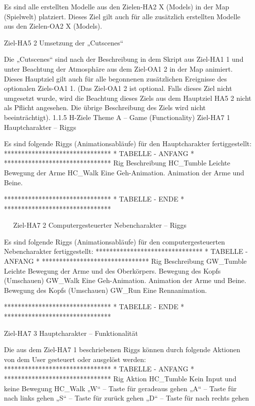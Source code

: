 Es sind alle erstellten Modelle aus den Zielen-HA2 X (Models) in der Map (Spielwelt) platziert. Dieses Ziel gilt auch für alle zusätzlich erstellten Modelle aus den Zielen-OA2 X (Models).

Ziel-HA5 2	Umsetzung der „Cutscenes“

Die „Cutscenes“ sind nach der Beschreibung in dem Skript aus Ziel-HA1 1 und unter Beachtung der Atmosphäre aus dem Ziel-OA1 2 in der Map animiert. Dieses Hauptziel gilt auch für alle begonnenen zusätzlichen Ereignisse des optionalen Ziels-OA1 1.
(Das Ziel-OA1 2 ist optional. Falls dieses Ziel nicht umgesetzt wurde, wird die Beachtung dieses Ziels aus dem Hauptziel HA5 2 nicht als Pflicht angesehen. Die übrige Beschreibung des Ziels wird nicht beeinträchtigt).
1.1.5	H-Ziele Theme A – Game (Functionality)
Ziel-HA7 1	Hauptcharakter – Riggs

Es sind folgende Riggs (Animationsabläufe) für den Hauptcharakter fertiggestellt:
		 *******************************
		 *  TABELLE - ANFANG           *
		 *******************************
Rig	Beschreibung
HC_Tumble	Leichte Bewegung der Arme
HC_Walk	Eine Geh-Animation. Animation der Arme und Beine.

		 *******************************
		 *  TABELLE - ENDE             *
		 *******************************




 
Ziel-HA7 2	Computergesteuerter Nebencharakter – Riggs

Es sind folgende Riggs (Animationsabläufe) für den computergesteuerten Nebencharakter fertiggestellt:
		 *******************************
		 *  TABELLE - ANFANG           *
		 *******************************
Rig	Beschreibung
GW_Tumble	Leichte Bewegung der Arme und des Oberkörpers.
Bewegung des Kopfs (Umschauen)
GW_Walk	Eine Geh-Animation. Animation der Arme und Beine.
Bewegung des Kopfs (Umschauen)
GW_Run 	Eine Rennanimation.

		 *******************************
		 *  TABELLE - ENDE             *
		 *******************************








Ziel-HA7 3	Hauptcharakter – Funktionalität

Die aus dem Ziel-HA7 1 beschriebenen Riggs können durch folgende Aktionen von dem User gesteuert oder ausgelöst werden:
		 *******************************
		 *  TABELLE - ANFANG           *
		 *******************************
Rig	Aktion
HC_Tumble	Kein Input und keine Bewegung
HC_Walk	„W“ – Taste für geradeaus gehen
„A“ – Taste für nach links gehen
„S“ – Taste für zurück gehen
„D“ – Taste für nach rechts gehen

